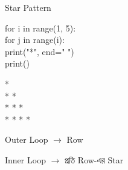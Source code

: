 \begin{codeoutputbox}{Star Pattern}

\noindent
\begin{minipage}[t]{0.53\linewidth}
\codeheading

\begin{english}
\ttfamily
for i in range(1, 5):\\
\hspace*{4mm}for j in range(i):\\
\hspace*{8mm}print("*", end=" ")\\
\hspace*{4mm}print()
\end{english}

\end{minipage}
\hfill
\begin{minipage}[t]{0.43\linewidth}
\outputheading

\begin{english}
\ttfamily
*\\
* *\\
* * *\\
* * * *
\end{english}

\medskip

Outer Loop
\(\rightarrow\)
Row

\medskip

Inner Loop
\(\rightarrow\)
প্রতি Row-এর Star

\end{minipage}

\end{codeoutputbox}



